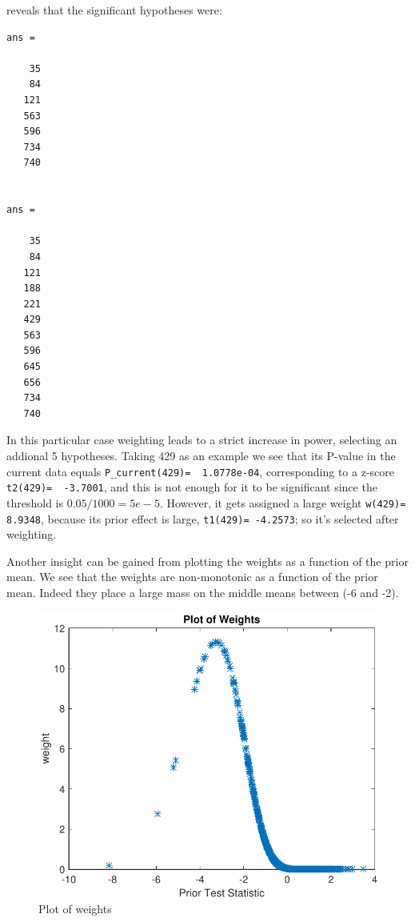 \documentclass[english,11pt]{article} %
\begin{document}
reveals that the significant hypotheses were:

\begin{verbatim}
ans =

    35
    84
   121
   563
   596
   734
   740


ans =

    35
    84
   121
   188
   221
   429
   563
   596
   645
   656
   734
   740
\end{verbatim}

In this particular case weighting leads to a strict increase in power, selecting an addional 5 hypotheses. Taking 429 as an example we see that its P-value in the current data equals \verb+P_current(429)=  1.0778e-04+, corresponding to a z-score \verb+t2(429)=  -3.7001+, and this is not enough for it to be significant since the threshold is $0.05/1000=5e-5$. However, it gets assigned a large weight  \verb+w(429)=  8.9348+, because its prior  effect is large, \verb+t1(429)= -4.2573+; so it's selected after weighting.

Another insight can be gained from plotting the weights as a function of the prior mean. We see that the weights are non-monotonic as a function of the prior mean. Indeed they place a large mass on the middle means between (-6 and -2).


\begin{figure}[ht!]
\centering
\includegraphics[scale=0.6]{"../Data/weights"}
\caption{Plot of weights}
\label{scatter_prior_current}
\end{figure}
\end{document}
